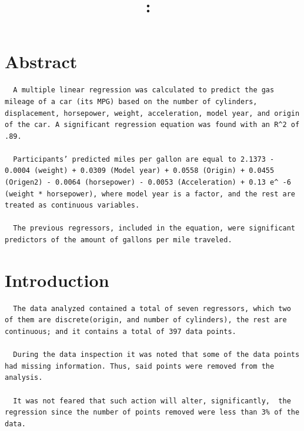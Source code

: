 \documentclass{article}
\title{
    \vspace{2in}
    \textmd{\textbf{\hmwkClass:\ \hmwkTitle}}\\
    \normalsize\vspace{0.1in}\small\vspace{0.1in}\large{\textit{\hmwkClassInstructor}}
    \vspace{3in}
}
\author{\hmwkAuthorName}
\date{}
\begin{document}
\maketitle

\newpage

\tableofcontents

\listoftables

\listoffigures

\newpage

\section{Abstract}

\begin{verbatim}
  A multiple linear regression was calculated to predict the gas mileage of a car (its MPG) based on the number of cylinders, displacement, horsepower, weight, acceleration, model year, and origin of the car. A significant regression equation was found with an R^2 of .89.
  
  Participants’ predicted miles per gallon are equal to 2.1373 - 0.0004 (weight) + 0.0309 (Model year) + 0.0558 (Origin) + 0.0455 (Origen2) - 0.0064 (horsepower) - 0.0053 (Acceleration) + 0.13 e^ -6 (weight * horsepower), where model year is a factor, and the rest are treated as continuous variables.
  
  The previous regressors, included in the equation, were significant predictors of the amount of gallons per mile traveled.
\end{verbatim}


\newpage

\section{Introduction}

\begin{verbatim}
  The data analyzed contained a total of seven regressors, which two of them are discrete(origin, and number of cylinders), the rest are continuous; and it contains a total of 397 data points.
  
  During the data inspection it was noted that some of the data points had missing information. Thus, said points were removed from the analysis.
  
  It was not feared that such action will alter, significantly,  the regression since the number of points removed were less than 3% of the data.
\end{verbatim}
\end{document}
